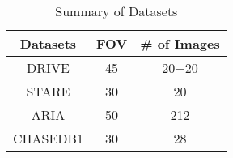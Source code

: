 \begin{table}
	\caption{Summary of Datasets}
	\centering
	\label{table:datasets}
	\begin{tabular}{c c c }
		\toprule
		{Datasets} & {FOV} &{\# of Images}  \\ \hline
		
		DRIVE & 45 & 20+20 \\
		
		STARE& 30 & 20  \\
	
		ARIA & 50 & 212 \\
		
		CHASEDB1 & 30 & 28\\
		
		\bottomrule
	\end{tabular}
\end{table}
